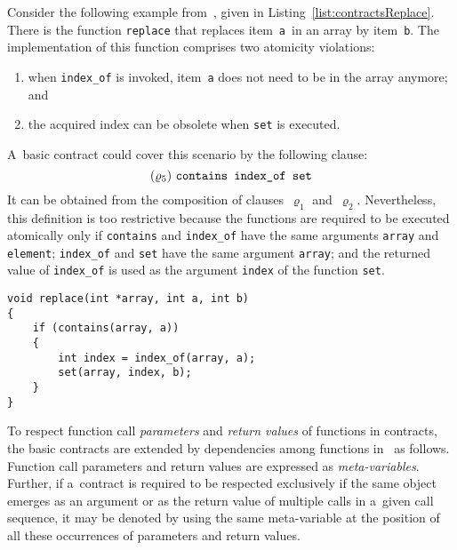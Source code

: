 \begin{example}
    Consider the following example from~\cite{contracts2017, contracts2015}, given in Listing~\ref{list:contractsReplace}. There is the function \texttt{replace} that replaces item~\texttt{a}~in an array by item~\texttt{b}. The implementation of this function comprises two atomicity violations:
    \begin{enumerate}
        \item when \texttt{index\_of} is invoked, item~\texttt{a} does not need to be in the array anymore; and

        \item the acquired index can be obsolete when \texttt{set} is executed.
    \end{enumerate}
    A~basic contract could cover this scenario by the following clause:
    $$
        (\varrho_5)\ \text{\texttt{contains index\_of set}}
    $$
    It can be obtained from the composition of clauses~$ \varrho_1 $ and~$ \varrho_2 $. Nevertheless, this definition is too restrictive because the functions are required to be executed atomically only if \texttt{contains} and \texttt{index\_of} have the same arguments \texttt{array} and \texttt{element}; \texttt{index\_of} and \texttt{set} have the same argument \texttt{array}; and the returned value of \texttt{index\_of} is used as the argument \texttt{index} of the function \texttt{set}.
\end{example}

\begin{lstlisting}[style=c, label={list:contractsReplace}, float=hbt, caption={An example of an atomicity violation with \emph{data dependencies}~\cite{contracts2017, contracts2015}}]
void replace(int *array, int a, int b)
{
    if (contains(array, a))
    {
        int index = index_of(array, a);
        set(array, index, b);
    }
}
\end{lstlisting}

To respect function call \emph{parameters} and \emph{return values} of functions in contracts, the basic contracts are extended by dependencies among functions in~\cite{contracts2017, contracts2015} as follows. Function call parameters and return values are expressed as \emph{meta-variables}. Further, if a~contract is required to be respected exclusively if the same object emerges as an argument or as the return value of multiple calls in a~given call sequence, it may be denoted by using the same meta-variable at the position of all these occurrences of parameters and return values.

